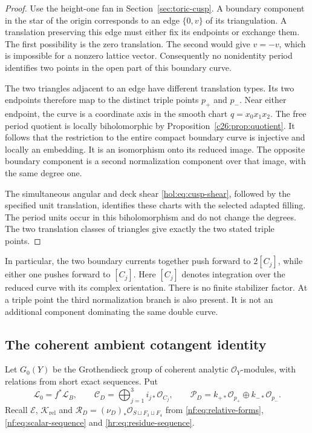 \begin{proof}
Use the height-one fan in Section~\ref{sec:toric-cusp}.
A boundary component in the star of the origin corresponds to
an edge $\{0,v\}$ of its triangulation.
A translation preserving this edge must either fix its endpoints
or exchange them. The first possibility is the zero translation.
The second would give $v=-v$, which is impossible for a nonzero
lattice vector.
Consequently no nonidentity period identifies two points in the
open part of this boundary curve.

The two triangles adjacent to an edge have different translation
types. Its two endpoints therefore map to the distinct triple
points $p_+$ and $p_-$.
Near either endpoint, the curve is a coordinate axis in the
smooth chart $q=x_0x_1x_2$.
The free period quotient is locally biholomorphic by
Proposition~\ref{c26:prop:quotient}.
It follows that the restriction to the entire compact boundary
curve is injective and locally an embedding. It is an isomorphism
onto its reduced image.
The opposite boundary component is a second normalization
component over that image, with the same degree one.

The simultaneous angular and deck shear
\eqref{hol:eq:cusp-shear}, followed by the specified unit
translation, identifies these charts with the selected adapted
filling. The period units occur in this biholomorphism and do not
change the degrees. The two translation classes of triangles give
exactly the two stated triple points.
\end{proof}

In particular, the two boundary currents together push forward
to $2[C_j]$, while either one pushes forward to $[C_j]$.
Here $[C_j]$ denotes integration over the reduced curve with its
complex orientation. There is no finite stabilizer factor.
At a triple point the third normalization branch is also present.
It is not an additional component dominating the same double curve.

\subsection{The coherent ambient cotangent identity}

Let $G_0(Y)$ be the Grothendieck group of coherent analytic
$\mathcal O_Y$-modules, with relations from short exact sequences.
Put
\[
 \mathcal L_0=f^*\mathscr L_B,\qquad
 \mathcal C_D=\bigoplus_{j=1}^3 i_{j*}\mathcal O_{C_j},\qquad
 \mathcal P_D=k_{+*}\mathcal O_{p_+}\oplus k_{-*}\mathcal O_{p_-}.
\]
Recall $\mathscr E$, $\mathcal K_{\mathrm{rel}}$ and
$\mathcal R_D=(\nu_D)_*\mathcal O_{S\sqcup F_3\sqcup F_4}$
from \eqref{nf:eq:relative-forms},
\eqref{nf:eq:scalar-sequence} and \eqref{hr:eq:residue-sequence}.

